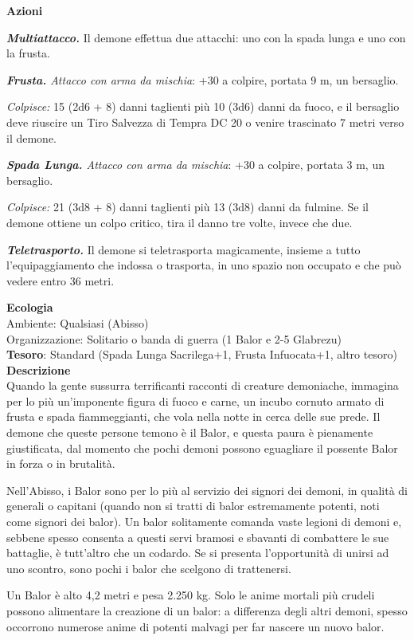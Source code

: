 \begin{multicols}{2}
\textbf{Azioni}

\textit{\textbf{Multiattacco.}} Il demone effettua due attacchi: uno con la spada lunga e uno con la frusta.

\textit{\textbf{Frusta.} Attacco con arma da mischia}: +30 a colpire, portata 9 m, un bersaglio.

\textit{Colpisce:} 15 (2d6 + 8) danni taglienti più 10 (3d6) danni da fuoco, e il bersaglio deve riuscire un Tiro Salvezza di Tempra DC 20 o venire trascinato 7 metri verso il demone.

\textit{\textbf{Spada Lunga.} Attacco con arma da mischia}: +30 a colpire, portata 3 m, un bersaglio.

\textit{Colpisce:} 21 (3d8 + 8) danni taglienti più 13 (3d8) danni da fulmine. Se il demone ottiene un colpo critico, tira il danno tre volte, invece che due.

\textit{\textbf{Teletrasporto.}} Il demone si teletrasporta magicamente, insieme a tutto l'equipaggiamento che indossa o trasporta, in uno spazio non occupato e che può vedere entro 36 metri.

\textbf{Ecologia}\\
Ambiente: Qualsiasi (Abisso)\\
Organizzazione: Solitario o banda di guerra (1 Balor e 2-5 Glabrezu)\\
\textbf{Tesoro}: Standard (Spada Lunga Sacrilega+1, Frusta Infuocata+1, altro tesoro)\\
\textbf{Descrizione}\\
Quando la gente sussurra terrificanti racconti di creature demoniache, immagina per lo più un'imponente figura di fuoco e carne, un incubo cornuto armato di frusta e spada fiammeggianti, che vola nella notte in cerca delle sue prede. Il demone che queste persone temono è il Balor, e questa paura è pienamente giustificata, dal momento che pochi demoni possono eguagliare il possente Balor in forza o in brutalità.

Nell'Abisso, i Balor sono per lo più al servizio dei signori dei demoni, in qualità di generali o capitani (quando non si tratti di balor estremamente potenti, noti come signori dei balor). Un balor solitamente comanda vaste legioni di demoni e, sebbene spesso consenta a questi servi bramosi e sbavanti di combattere le sue battaglie, è tutt'altro che un codardo. Se si presenta l'opportunità di unirsi ad uno scontro, sono pochi i balor che scelgono di trattenersi.

Un Balor è alto 4,2 metri e pesa 2.250 kg. Solo le anime mortali più crudeli possono alimentare la creazione di un balor: a differenza degli altri demoni, spesso occorrono numerose anime di potenti malvagi per far nascere un nuovo balor.


\end{multicols}
